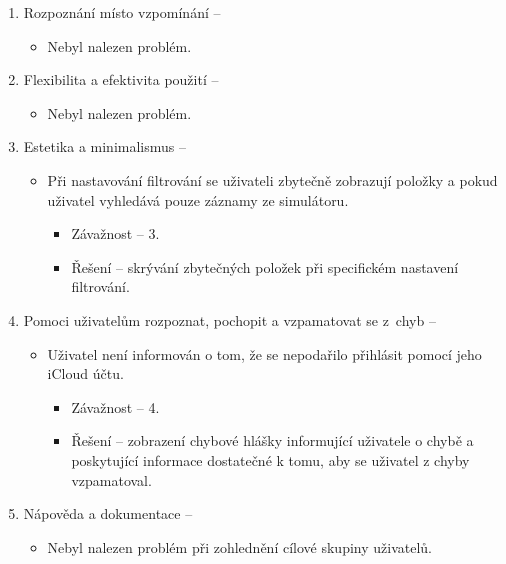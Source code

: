 \documentclass[thesis=M,czech]{FITthesis}[2012/06/26]
\begin{document}
\begin{enumerate}
\item Rozpoznání místo vzpomínání -- 
\begin{itemize}
 	\item Nebyl nalezen problém.
\end{itemize}
 
\item Flexibilita a efektivita použití -- 
\begin{itemize}
 	\item Nebyl nalezen problém.
\end{itemize}
 
\item Estetika a minimalismus --
\begin{itemize}
\item Při nastavování filtrování se uživateli zbytečně zobrazují položky  a  pokud uživatel vyhledává pouze záznamy ze simulátoru.
\begin{itemize}
	\item Závažnost -- 3.
	\item Řešení -- skrývání zbytečných položek při specifickém nastavení filtrování.
\end{itemize}
\end{itemize}  
  
\item Pomoci uživatelům rozpoznat, pochopit a vzpamatovat se z~chyb -- 
\begin{itemize}
\item Uživatel není informován o tom, že se nepodařilo přihlásit pomocí jeho iCloud účtu.
\begin{itemize}
	\item Závažnost -- 4.
	\item Řešení -- zobrazení chybové hlášky informující uživatele o chybě a poskytující informace dostatečné  k tomu, aby se uživatel z chyby vzpamatoval.
\end{itemize}
\end{itemize}

\item Nápověda a dokumentace -- 
\begin{itemize}
 	\item Nebyl nalezen problém při zohlednění cílové skupiny uživatelů.
\end{itemize}
\end{enumerate}
\end{document}
